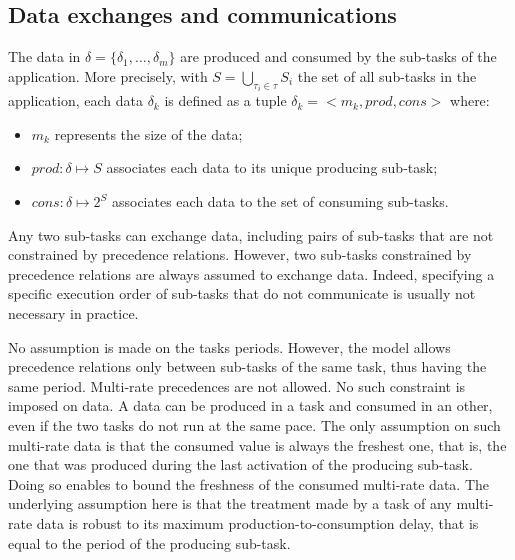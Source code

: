 \documentclass[main.tex]{subfiles}
\begin{document}
\subsection{Data exchanges and communications}
The data in $\delta = \{ \delta_1 , \ldots , \delta_m \}$ are produced and
consumed by the sub-tasks of the application. More precisely, with $S =
\underset{\tau_i \in \tau}{\bigcup} S_i$ the set of all sub-tasks in the
application, each data $\delta_k$ is defined as a tuple $\delta_k = < m_k ,
prod , cons >$ where:
\begin{itemize}
    \item $m_k$ represents the size of the data;
    \item $prod : \delta \mapsto S$ associates each data to its unique
        producing sub-task;
    \item $cons : \delta \mapsto 2^S$ associates each data to the set of
        consuming sub-tasks.
\end{itemize}

Any two sub-tasks can exchange data, including pairs of sub-tasks that are not
constrained by precedence relations. However, two sub-tasks constrained by
precedence relations are always assumed to exchange data. Indeed, specifying a
specific execution order of sub-tasks that do not communicate is usually not
necessary in practice.

No assumption is made on the tasks periods. However, the model allows
precedence relations only between sub-tasks of the same task, thus having the
same period. Multi-rate precedences are not allowed. No such constraint is
imposed on data. A data can be produced in a task and consumed in an other,
even if the two tasks do not run at the same pace. The only assumption on such
multi-rate data is that the consumed value is always the freshest one, that is,
the one that was produced during the last activation of the producing sub-task.
Doing so enables to bound the freshness of the consumed multi-rate data. The
underlying assumption here is that the treatment made by a task of any
multi-rate data is robust to its maximum production-to-consumption delay, that
is equal to the period of the producing sub-task.
\end{document}
